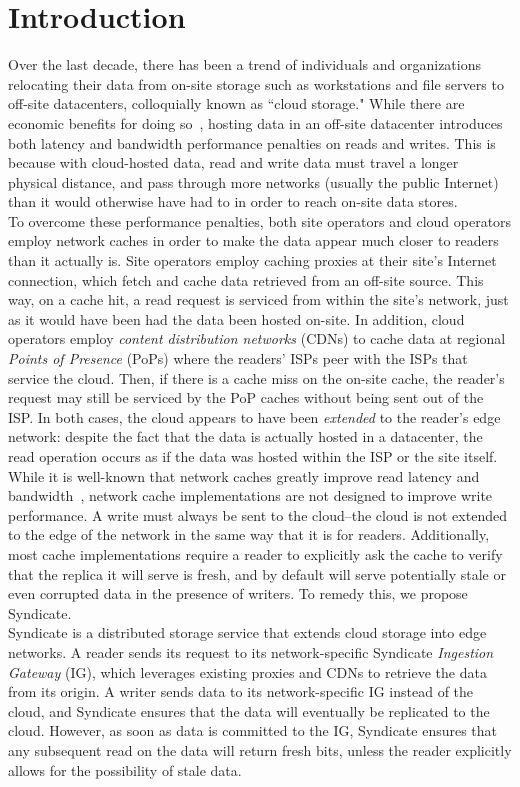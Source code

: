 \section{Introduction}


Over the last decade, there has been a trend of individuals and organizations relocating their data from on-site storage such as workstations and file servers to off-site datacenters, colloquially known as ``cloud storage."  While there are economic benefits for doing so~\cite{CITATION NEEDED}, hosting data in an off-site datacenter introduces both latency and bandwidth performance penalties on reads and writes.  This is because with cloud-hosted data, read and write data must travel a longer physical distance, and pass through more networks (usually the public Internet) than it would otherwise have had to in order to reach on-site data stores.
\\
To overcome these performance penalties, both site operators and cloud operators employ network caches in order to make the data appear much closer to readers than it actually is.  Site operators employ caching proxies at their site's Internet connection, which fetch and cache data retrieved from an off-site source.  This way, on a cache hit, a read request is serviced from within the site's network, just as it would have been had the data been hosted on-site.  In addition, cloud operators employ \textit{content distribution networks} (CDNs) to cache data at regional \textit{Points of Presence} (PoPs) where the readers' ISPs peer with the ISPs that service the cloud.  Then, if there is a cache miss on the on-site cache, the reader's request may still be serviced by the PoP caches without being sent out of the ISP.  In both cases, the cloud appears to have been \textit{extended} to the reader's edge network:  despite the fact that the data is actually hosted in a datacenter, the read operation occurs as if the data was hosted within the ISP or the site itself.
\\
While it is well-known that network caches greatly improve read latency and bandwidth~\cite{Every CDN paper}, network cache implementations are not designed to improve write performance.  A write must always be sent to the cloud--the cloud is not extended to the edge of the network in the same way that it is for readers.  Additionally, most cache implementations require a reader to explicitly ask the cache to verify that the replica it will serve is fresh, and by default will serve potentially stale or even corrupted data in the presence of writers.  To remedy this, we propose Syndicate.
\\
Syndicate is a distributed storage service that extends cloud storage into edge networks.  A reader sends its request to its network-specific Syndicate \textit{Ingestion Gateway} (IG), which leverages existing proxies and CDNs to retrieve the data from its origin.  A writer sends data to its network-specific IG instead of the cloud, and Syndicate ensures that the data will eventually be replicated to the cloud.  However, as soon as data is committed to the IG, Syndicate ensures that any subsequent read on the data will return fresh bits, unless the reader explicitly allows for the possibility of stale data.

